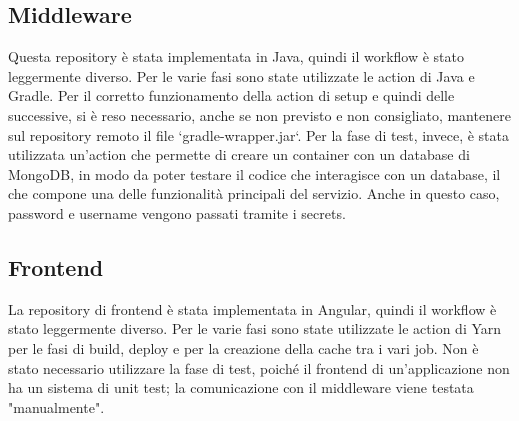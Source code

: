 \subsection{Middleware} 
Questa repository è stata implementata in Java, quindi il workflow è stato leggermente diverso. Per le varie fasi sono state utilizzate le action di Java e Gradle. Per il corretto funzionamento della action di setup e quindi delle successive, si è reso necessario, anche se non previsto e non consigliato, mantenere sul repository remoto il file `gradle-wrapper.jar`. Per la fase di test, invece, è stata utilizzata un'action che permette di creare un container con un database di MongoDB, in modo da poter testare il codice che interagisce con un database, il che compone una delle funzionalità principali del servizio. Anche in questo caso, password e username vengono passati tramite i secrets.

\subsection{Frontend}
La repository di frontend è stata implementata in Angular, quindi il workflow è stato leggermente diverso. Per le varie fasi sono state utilizzate le action di Yarn per le fasi di build, deploy e per la creazione della cache tra i vari job. Non è stato necessario utilizzare la fase di test, poiché il frontend di un'applicazione non ha un sistema di unit test; la comunicazione con il middleware viene testata "manualmente".



